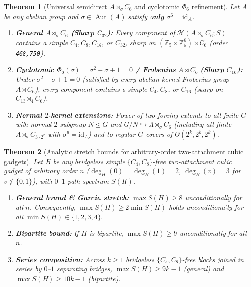 \documentclass[11pt]{amsart}
\newtheorem{theorem}{Theorem}[section]
\theoremstyle{remark}
\newcommand{\Z}{\mathbb{Z}}
\newcommand{\Haar}{\mathcal{H}}
\newcommand{\Aut}{\operatorname{Aut}}
\newcommand{\id}{\mathrm{id}}
\begin{document}
\begin{theorem}[Universal semidirect $A \rtimes_\sigma C_6$ and cyclotomic $\Phi_6$ refinement]\label{thm:semidirect_c6}
Let $A$ be any abelian group and $\sigma \in \Aut(A)$ satisfy \textbf{only} $\sigma^6 = \id_A$.
\begin{enumerate}[label=(\alph*)]
\item \textbf{General $A \rtimes_\sigma C_6$ (Sharp $C_{32}$):} Every component of $\Haar(A \rtimes_\sigma C_6; S)$ contains a simple $C_4, C_8, C_{16}$, or $C_{32}$, sharp on $(\Z_5 \times \Z_5^6) \rtimes C_6$ (order \texttt{468,750}).
\item \textbf{Cyclotomic $\Phi_6(\sigma) = \sigma^2 - \sigma + 1 = 0$ / Frobenius $A \rtimes C_6$ (Sharp $C_{16}$):} Under $\sigma^2 - \sigma + 1 = 0$ (satisfied by every abelian-kernel Frobenius group $A \rtimes C_6$), every component contains a simple $C_4, C_8$, or $C_{16}$ (sharp on $C_{13} \rtimes_4 C_6$).
\item \textbf{Normal $2$-kernel extensions:} Power-of-two forcing extends to all finite $G$ with normal $2$-subgroup $N \trianglelefteq G$ and $G/N \hookrightarrow A \rtimes_\sigma C_6$ (including all finite $A \rtimes_\sigma C_{3 \cdot 2^r}$ with $\sigma^6 = \id_A$) and to regular $G$-covers of $\Theta(2^k, 2^k, 2^k)$.
\end{enumerate}
\end{theorem}

\begin{theorem}[Analytic stretch bounds for arbitrary-order two-attachment cubic gadgets]\label{thm:gadget_stretch}
Let $H$ be any bridgeless simple $\{C_4, C_8\}$-free two-attachment cubic gadget of arbitrary order $n$ ($\deg_H(0) = \deg_H(1) = 2$, $\deg_H(v) = 3$ for $v \notin \{0, 1\}$), with $0$--$1$ path spectrum $S(H)$.
\begin{enumerate}[label=(\alph*)]
\item \textbf{General bound \& Garcia stretch:} $\max S(H) \ge 8$ unconditionally for all $n$. Consequently, $\max S(H) \ge 2 \min S(H)$ holds unconditionally for all $\min S(H) \in \{1, 2, 3, 4\}$.
\item \textbf{Bipartite bound:} If $H$ is bipartite, $\max S(H) \ge 9$ unconditionally for all $n$.
\item \textbf{Series composition:} Across $k \ge 1$ bridgeless $\{C_4, C_8\}$-free blocks joined in series by $0$--$1$ separating bridges, $\max S(H) \ge 9k - 1$ (general) and $\max S(H) \ge 10k - 1$ (bipartite).
\end{enumerate}
\end{theorem}
\end{document}
